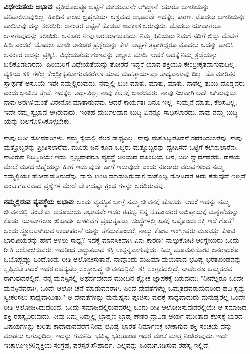 \textbf{ವಿಧೇಯತೆಯ ಅಭಾವ}: ಪ್ರತಿಯೊಬಪ್ನೂ ಅಪ್ಪಣೆ ಮಾಡುವವನೇ ಆಗಿದ್ದಾನೆ. ಯಾರೂ ಆಣತಿಯನ್ನು ಪರಿಪಾಲಿಸುವುದಿಲ್ಲ. ಹಿಂದಿನ ಕಾಲದ ಬ್ರಹ್ಮಚರ್ಯ ಆಶ್ರಮದ ಅಭಾವವೇ ಇದಕ್ಕೆಲ್ಲ ಕಾರಣ. ಮೊದಲು ಆಣತಿಯನ್ನು ಪಾಲಿಸುವು ದನ್ನು ಕಲಿಯಿರಿ. ಅನಂತರ ಅಪ್ಪಣೆ ಕೊಡುವ ಅವಕಾಶ ಬರುವುದು. ಮೊದಲು ಯಾವಾಗಲೂ ಆಳಾಗುವುದನ್ನು ಕಲಿಯಿರಿ. ಅನಂತರ ನೀವು ಅರಸರಾಗಬಹುದು. ನಿಮ್ಮ ಹಿರಿಯರು ನಿಮಗೆ ನದಿಗೆ ಬಿದ್ದು ಮೊಸಳೆ ಹಿಡಿ ಎಂದರೆ, ಮೊದಲು ಮಾಡಿ ಅನಂತರ ಪ್ರಶ್ನೆಯನ್ನು ಕೇಳಿ. ಅಪ್ಪಣೆ ತಪ್ಪಾಗಿದ್ದರೂ ಮೊದಲು ಅದನ್ನು ಪಾಲಿಸಿ ಅನಂತರ ಅದನ್ನು ಪ್ರಶ್ನಿಸಿ. ವಿಧೇಯತೆಯ ಗುಣವನ್ನು ಅಭ್ಯಾಸ ಮಾಡಿ. ಆದರೆ ಅದಕ್ಕೆ ನಿಮ್ಮ ಶ್ರದ್ಧೆಯನ್ನು ಬಲಿಕೊಡಬಾರದು. ಹಿರಿಯರಿಗೆ ವಿಧೇಯತೆಯನ್ನು ತೋರದೆ ಇದ್ದರೆ ಯಾವ ಶಕ್ತಿಯೂ ಕೇಂದ್ರೀಕೃತವಾಗುವುದಿಲ್ಲ. ವ್ಯಕ್ತಿಯ ಶಕ್ತಿ ಗಳೆಲ್ಲ ಕೇಂದ್ರೀಕೃತವಾಗುವವರೆಗೂ ಯಾವ ಮಹತ್ಕಾರ್ಯವೂ ಸಾಧ್ಯವಾಗುವು ದಿಲ್ಲ. ಸೋಮಾರಿತನ ಸ್ವಾರ್ಥತೆ ಅಸೂಯೆ ಇವೇ ನಮ್ಮಲ್ಲಿರುವುದು. ನಮ್ಮಲ್ಲಿ ಬರೀ ಮಾತು, ಮಾತು, ಮಾತು. ನಾವೆಲ್ಲ ತುಂಬ ದೊಡ್ಡವರು ಎಂದು ಭಾವಿಸು ತ್ತೇವೆ. ಇದಕ್ಕೆಲ್ಲ ಅರ್ಥವಿಲ್ಲ. ನಾವು ಕೆಲಸಕ್ಕೆ ಬಾರದವರು. ನಾವು ನಿಜವಾಗಿ ಅದೇ ಆಗಿರುವುದು. ನಾವು ಅರಗಿಳಿಯಂತೆ ಏನೇನೋ ಮಾತಾಡುವೆವು. ಆದರೆ ಕಾರ್ಯತಃ ಏನೂ ಇಲ್ಲ. ಸುಮ್ಮನೆ ಮಾತು, ಕೆಲಸವಿಲ್ಲ, ಇದೇ ನಮ್ಮ ಸ್ವಭಾವ ಆಗಿರುವುದು. ಇಂತಹ ದುರ್ಬಲವಾದ ಬುದ್ಧಿ ಏನನ್ನೂ ಸಾಧಿಸಲಾರದು. ನಾವು ನಮ್ಮ ಬುದ್ಧಿ ಯನ್ನು ಬಲಗೊಳಿಸಿಕೊಳ್ಳಬೇಕು.

ನಾವು ಬರೀ ಸೋಮಾರಿಗಳು. ನಮ್ಮ ಕೈಯಲ್ಲಿ ಕೆಲಸ ಸಾಧ್ಯವಿಲ್ಲ. ನಾವು ಮತ್ತೊಬ್ಬರೊಡನೆ ಸಹಕರಿಸಲಾರೆವು. ನಾವು ಮತ್ತೊಬ್ಬರನ್ನು ಪ್ರೀತಿಸಲಾರೆವು. ಮೂರು ಜನ ಕೂಡ ಒಬ್ಬರು ಮತ್ತೊಬ್ಬರನ್ನು ದ್ವೇಷಿಸದೆ ಒಟ್ಟಿಗೆ ಕಲೆಯಲಾರೆವು. ನಾವಿರುವ ನಿಜಸ್ಥಿತಿಯೇ ಇದು. ಸ್ವಲ್ಪವಾದರೂ ವ್ಯವಸ್ಥೆ ಅರಿಯದ ದೊಂಬಿಯ ಜನ, ಬರೀ ಸ್ವಾರ್ಥಪರರು. ಹಣೆಯ ಮೇಲೆ ಮತದ ಚಿಹ್ನೆಯನ್ನು ಹೀಗೆ ಇಡು ವುದೇ ಹಾಗೆ ಇಡುವುದೇ ಎಂದು ನೂರಾರು ವರುಷಗಳಿಂದ ನಮ್ಮ ನಮ್ಮಲ್ಲಿಯೇ ಹೋರಾಡುತ್ತಿರುವೆವು. ನಾನು ಊಟ ಮಾಡುತ್ತಿರುವಾಗ ಮತ್ತೊಬ್ಬ ನೋಡಿದರೆ ಅದು ಕೆಡುವುದೆ ಇಲ್ಲವೆ ಎಂಬ ಗಹನವಾದ ಪ್ರಶ್ನೆಗಳ ಮೇಲೆ ಬೇಕಾದಷ್ಟು ಗ್ರಂಥ ಗಳನ್ನು ಬರೆದಿರುವೆವು.

\textbf{ನಮ್ಮಲ್ಲಿರುವ ವ್ಯವಸ್ಥೆಯ ಅಭಾವ}: ಒಂದು ವ್ಯವಸ್ಥಿತ ಬಾಳ್ವೆ ನಮ್ಮ ಜೀವನಕ್ಕೆ ಹೊಸದು. ಆದರೆ ಇದನ್ನು ನಮ್ಮ ಜೀವನದಲ್ಲಿ ತರಬೇಕು. ಅಸೂಯೆಯ ಅಭಾವವೇ ಇದರ ರಹಸ್ಯ. ನಿನ್ನ ಸಹೋದರರ ಅಭಿಪ್ರಾಯಕ್ಕೆ ಮನ್ನಣೆಯನ್ನು ಕೊಡು. ಯಾವಾಗಲೂ ಸೌಹಾರ್ದ ಬಾಳುವೆಗೆ ಪ್ರಯತ್ನಪಡು. ಸಂಸ್ಥೆಗಳಲ್ಲಿ ಏತಕ್ಕೆ ಅಷ್ಟೊಂದು ಶಕ್ತಿ ಇದೆ ಗೊತ್ತೆ? ಒಂದು ಸ್ಥೂಲವಾಗಿರುವ ಉದಾಹರಣೆ ಯನ್ನು ತೆಗೆದುಕೊಂಡರೆ, ನಾಲ್ಕು ಕೋಟಿ ಇಂಗ್ಲೀಷರು ಮೂವತ್ತು ಕೋಟಿ ಭಾರತೀಯರನ್ನು ಹೇಗೆ ಆಳಲು ಸಾಧ್ಯ? ಇದಕ್ಕೆ ಮಾನಸಿಕವಾಗಿ ಏನು ಕಾರಣ? ನಾಲ್ಕುಕೋಟಿ ಆಂಗ್ಲೇಯರು ಒಂದು ರೀತಿ ಆಲೋಚಿಸುವರು. ಇದರಿಂದ ಅದ್ಭುತವಾದ ಶಕ್ತಿ ಉತ್ಪನ್ನವಾಗುವುದು. ನಿಮ್ಮ ಮೂವತ್ತುಕೋಟಿ ಜನರಾದರೊ ಒಬೊಪ್ಬಪ್ನೂ ಒಂದೊಂದು ರೀತಿ ಆಲೋಚಿಸುತ್ತಾನೆ. ನಾವೊಂದು ಮಹಿಮಾ ಮಯವಾದ ಭವಿಷ್ಯ ಭರತಖಂಡವನ್ನು ಸೃಷ್ಟಿಸಬೇಕಾದರೆ ಇದರ ರಹಸ್ಯವೆಲ್ಲ ಸಂಸ್ಥಾಬದ್ಧ ಜೀವನದಲ್ಲಿದೆ, ಶಕ್ತಿ ಸಂಗ್ರಹದಲ್ಲಿದೆ, ನಾವೆಲ್ಲರೂ ಒಮ್ಮತದವ ರಾಗುವುದರಲ್ಲಿದೆ. ನನ್ನ ಮನಸ್ಸಿನಲ್ಲಿ ಅಥರ್ವವೇದದ ಮುಂದಿನ ಶ್ಲೋಕ ಜ್ಞಾಪಕಕ್ಕೆ ಬರುವುದು: "ನೀವೆಲ್ಲರೂ ಒಂದೇ ಮನಸ್ಸಿನವರಾಗಿ, ಒಂದೇ ಆಲೋ ಚನೆ ಮಾಡುವವರಾಗಿ. ಹಿಂದೆ ದೇವತೆಗಳೆಲ್ಲ ಒಮ್ಮತದವರಾದುದರಿಂದ ಹವಿ ಸ್ಸನ್ನು ಸ್ವೀಕರಿಸಲು ಸಾಧ್ಯವಾಯಿತು." ಆ ದೇವತೆಗಳನ್ನು ಮನುಷ್ಯನು ಪೂಜಿಸು ವುದಕ್ಕೆ ಸಾಧ್ಯವಾದುದು ಮನುಷ್ಯರೆಲ್ಲ ಒಂದೇ ರೀತಿ ಆಲೋಚಿಸಿದುದರಿಂದ. ಒಂದು ಸಮಾಜದಲ್ಲಿರುವವರೆಲ್ಲ ಒಂದು ರೀತಿ ಆಲೋಚಿಸುವುದರಲ್ಲಿಯೇ ಆ ಸಮಾಜದ ಶಕ್ತಿ ರಹಸ್ಯವಿರುವುದು. ನೀವು ನಿಮ್ಮ ನಿಮ್ಮಲ್ಲಿ ಬ್ರಾಹ್ಮಣ ಬ್ರಾಹ್ಮ ಣೇತರ ದ್ರಾವಿಡ ಆರ್ಯ ಮುಂತಾದ ಕೆಲಸಕ್ಕೆ ಬಾರದ ವಿಷಯಗಳನ್ನು ಕುರಿತು ಕಾದಾಡುವವರೆಗೆ ನೀವು ಭವಿಷ್ಯ ಭಾರತ ನಿರ್ಮಾಣಕ್ಕೆ ಬೇಕಾಗುವ ಶಕ್ತಿ ಸಂಚಯ ವನ್ನು ಮಾಡಲು ಆಗುವುದಿಲ್ಲ. ಇದನ್ನು ಗಮನಿಸಿ. ಭವಿಷ್ಯ ಭರತಖಂಡ ಇದರ ಮೇಲೆ ಮಾತ್ರ ನಿಂತಿರುವುದು. ಇದೇ ಇಚಾಊಇ್ಕ86ದ್ಶಕ್ತಿಯ ಸಂಗ್ರಹ, ಪರಸ್ಪರ ಸೌಹಾರ್ದ. ಎಲ್ಲವನ್ನು ಒಂದುಗೂಡಿಸುವ ರಹಸ್ಯ ಇಲ್ಲಿದೆ.

